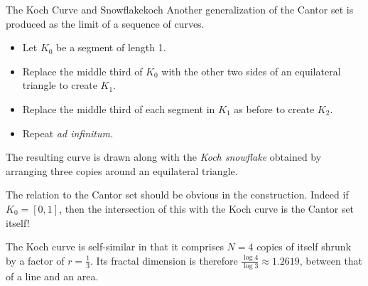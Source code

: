 \goodbreak


\begin{example}{The Koch Curve and Snowflake}{koch}
	Another generalization of the Cantor set is produced as the limit of a sequence of curves.\par
	\begin{minipage}[t]{0.64\linewidth}\vspace{-4pt}
		\begin{itemize}\itemsep0pt
		  \item Let $K_0$ be a segment of length 1.
		  \item Replace the middle third of $K_0$ with the other two sides of an equilateral triangle to create $K_1$.
		  \item Replace the middle third of each segment in $K_1$ as before to create $K_2$.
		  \item Repeat \emph{ad infinitum.}
		\end{itemize}
		The resulting curve is drawn along with the \emph{Koch snowflake} obtained by arranging three copies around an equilateral triangle.\smallbreak
		
		The relation to the Cantor set should be obvious in the construction. Indeed if $K_0=[0,1]$, then the intersection of this with the Koch curve is the Cantor set itself!\smallbreak
		
		The Koch curve is self-similar in that it comprises $N=4$ copies of itself shrunk by a factor of $r=\frac 13$. Its fractal dimension is therefore $\frac{\log 4}{\log 3}\approx 1.2619$, between that of a line and an area.\smallbreak
		

\end{minipage}
\end{example}
